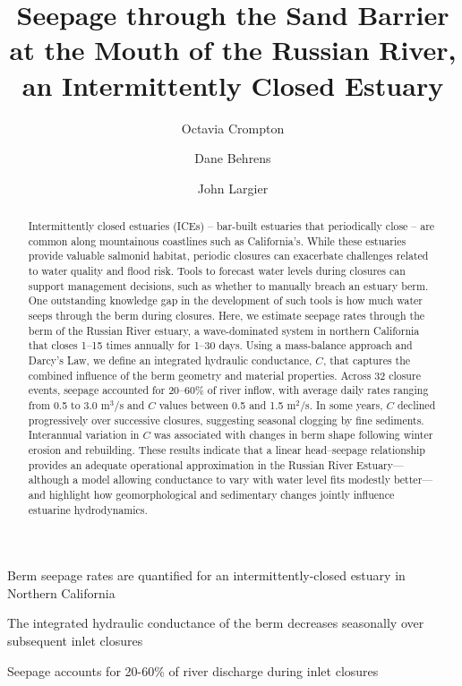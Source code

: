 \documentclass[preprint,12pt,authoryear]{elsarticle}
\begin{document}
\begin{frontmatter}

    \title{Seepage through the Sand Barrier at the Mouth of the Russian River, an Intermittently Closed Estuary}

\author[ars]{Octavia Crompton}

\author[epa]{Dane Behrens}

\author[bml]{John Largier}

\begin{abstract}
 Intermittently closed estuaries (ICEs) -- bar-built estuaries that periodically close --  are common along mountainous coastlines such as California's. While these estuaries provide valuable salmonid habitat, periodic closures can exacerbate challenges related to water quality and flood risk. Tools to forecast water levels during closures can support management decisions, such as whether to manually breach an estuary berm. One outstanding knowledge gap in the development of such tools is how much water seeps through the berm during closures.
Here, we estimate seepage rates through the berm of the Russian River estuary, a wave-dominated system in northern California that closes 1--15 times annually for 1--30 days. Using a mass-balance approach and Darcy's Law, we define an integrated hydraulic conductance, $C$, that captures the combined influence of the berm geometry and material properties. Across 32 closure events, seepage accounted for 20--60\% of river inflow, with average daily rates ranging from 0.5 to 3.0 m$^3$/s and $C$ values between 0.5 and 1.5 m$^2$/s. In some years, $C$ declined progressively over successive closures, suggesting seasonal clogging by fine sediments. Interannual variation in $C$ was associated with changes in berm shape following winter erosion and rebuilding. These results indicate that a linear head--seepage relationship provides an adequate operational approximation in the Russian River Estuary---although a model allowing conductance to vary with water level fits modestly better---and highlight how geomorphological and sedimentary changes jointly influence estuarine hydrodynamics.
\end{abstract}

\begin{highlights}
\item Berm seepage rates are quantified for an  intermittently-closed estuary in Northern California
\item The integrated hydraulic conductance of the berm decreases seasonally over subsequent inlet closures
\item Seepage accounts for 20-60\% of river discharge during inlet closures
\end{highlights}


\end{frontmatter}
\end{document}
